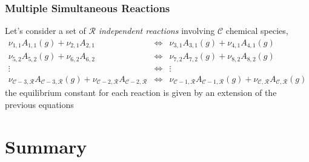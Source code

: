 \documentclass[10pt,compress,handout,unknownkeysallowed]{beamer}
\begin{document}
\begin{frame}
  \frametitle{Multiple Simultaneous Reactions}
      Let's consider a set of $\mathcal{R}$ {\it independent reactions} involving $\mathcal{C}$ chemical species, 
               \begin{eqnarray}
                     \nu_{1,1}A_{1,1} (g) + \nu_{2,1}A_{2,1} &\Longleftrightarrow& \nu_{3,1}A_{3,1} (g) + \nu_{4,1}A_{4,1} (g) \nonumber\\
                     \nu_{5,2}A_{5,2} (g) + \nu_{6,2}A_{6,2} &\Longleftrightarrow& \nu_{7,2}A_{7,2} (g) + \nu_{8,2}A_{8,2} (g)  \nonumber\\
                                 \vdots               &\Longleftrightarrow&     \vdots                         \nonumber\\
                     \nu_{\mathcal{C}-3,\mathcal{R}}A_{\mathcal{C}-3,\mathcal{R}} (g) + \nu_{\mathcal{C}-2,\mathcal{R}}A_{\mathcal{C}-2,\mathcal{R}} &\Longleftrightarrow& \nu_{\mathcal{C}-1,\mathcal{R}}A_{\mathcal{C}-1,\mathcal{R}} (g) + \nu_{\mathcal{C},\mathcal{R}}A_{\mathcal{C},\mathcal{R}} (g) \nonumber
               \end{eqnarray}
      the equilibrium constant for each reaction is given by an extension of the previous equations


\end{frame}
\normalsize

\section{Summary}
\end{document}
